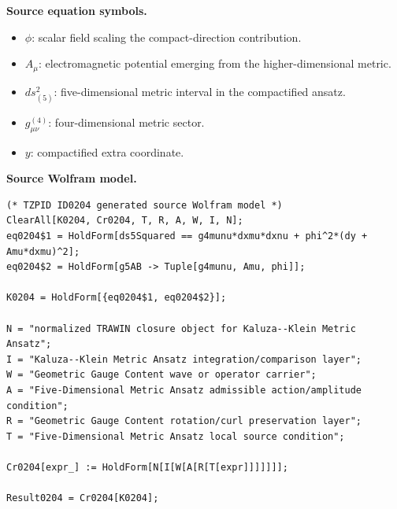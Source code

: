 \begin{minipage}[t]{0.49\linewidth}
\begingroup
\small
\raggedright
\textbf{Source equation symbols.}\par
\begin{itemize}[leftmargin=1.35em,itemsep=1pt,topsep=1pt,parsep=0pt]
    \item $\phi$: scalar field scaling the compact-direction contribution.
    \item $A_{\mu}$: electromagnetic potential emerging from the higher-dimensional metric.
    \item $ds^2_{(5)}$: five-dimensional metric interval in the compactified ansatz.
    \item $g^{(4)}_{\mu\nu}$: four-dimensional metric sector.
    \item $y$: compactified extra coordinate.
\end{itemize}
\endgroup
\end{minipage}\hfill
\begin{minipage}[t]{0.47\linewidth}
\begingroup
\scriptsize
\raggedright
\textbf{Source Wolfram model.}\par
\begin{Verbatim}[fontsize=\tiny,breaklines=true,breakanywhere=true]
(* TZPID ID0204 generated source Wolfram model *)
ClearAll[K0204, Cr0204, T, R, A, W, I, N];
eq0204$1 = HoldForm[ds5Squared == g4munu*dxmu*dxnu + phi^2*(dy + Amu*dxmu)^2];
eq0204$2 = HoldForm[g5AB -> Tuple[g4munu, Amu, phi]];

K0204 = HoldForm[{eq0204$1, eq0204$2}];

N = "normalized TRAWIN closure object for Kaluza--Klein Metric Ansatz";
I = "Kaluza--Klein Metric Ansatz integration/comparison layer";
W = "Geometric Gauge Content wave or operator carrier";
A = "Five-Dimensional Metric Ansatz admissible action/amplitude condition";
R = "Geometric Gauge Content rotation/curl preservation layer";
T = "Five-Dimensional Metric Ansatz local source condition";

Cr0204[expr_] := HoldForm[N[I[W[A[R[T[expr]]]]]]];

Result0204 = Cr0204[K0204];
\end{Verbatim}
\endgroup
\end{minipage}

